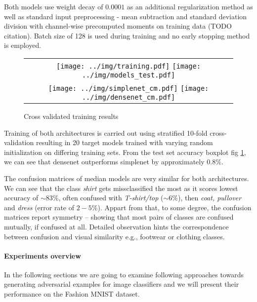 Both models use weight decay of $0.0001$ as an additional regularization method as well as standard input preprocessing - mean subtraction and standard deviation division with channel-wise precomputed moments on training data (TODO citation). Batch size of 128 is used during training and no early stopping method is employed.

\begin{figure}
\centering
\begin{tabular}{@{}c@{}}
    \texttt{[image: ../img/training.pdf]}
    \texttt{[image: ../img/models\_test.pdf]} \\
    \texttt{[image: ../img/simplenet\_cm.pdf]}
    \texttt{[image: ../img/densenet\_cm.pdf]}  \\
\end{tabular}
\caption{Cross validated training results}
\label{fig:training}
\end{figure}

Training of both architectures is carried out using stratified 10-fold cross-validation resulting in 20 target models trained with varying random initialization on differing training sets. From the test set accuracy boxplot fig \ref{fig:training}, we can see that densenet outperforms simplenet by approximately $0.8\%$.

The confusion matrices of median models are very similar for both architectures. We can see that the class \emph{shirt} gets missclassified the most as it scores lowest accuracy of $\sim 83\%$, often confused with \emph{T-shirt/top} ($\sim 6\%$), then \emph{coat, pullover} and \emph{dress} (error rate of $2-5\%$). Appart from that, to some degree, the confusion matrices report symmetry -- showing that most pairs of classes are confused mutually, if confused at all. Detailed observation hints the correspondence between confusion and visual similarity e.g., footwear or clothing classes.

\paragraph{Experiments overview}

In the following sections we are going to examine following approaches towards generating adversarial examples for image classifiers and we will present their performance on the Fashion MNIST dataset.

